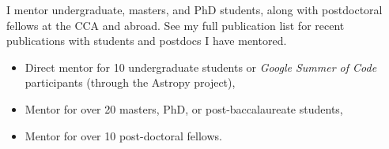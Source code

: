 \documentclass[12pt, letterpaper]{apw-cv}
\begin{document}









I mentor undergraduate, masters, and PhD students, along with postdoctoral fellows at the CCA and abroad. See my full publication list for recent publications with students and postdocs I have mentored.
\begin{itemize}
    \item Direct mentor for 10 undergraduate students or \textit{Google Summer of Code} participants (through the Astropy project),
    \item Mentor for over 20 masters, PhD, or post-baccalaureate students,
    \item Mentor for over 10 post-doctoral fellows.
\end{itemize}
\end{document}
